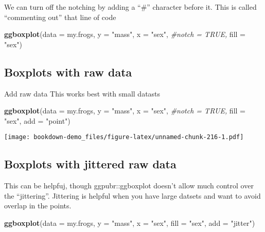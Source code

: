 \documentclass[]{book}
\newenvironment{Shaded}{\begin{snugshade}}{\end{snugshade}}
\newcommand{\KeywordTok}[1]{\textcolor[rgb]{0.13,0.29,0.53}{\textbf{#1}}}
\newcommand{\DataTypeTok}[1]{\textcolor[rgb]{0.13,0.29,0.53}{#1}}
\newcommand{\StringTok}[1]{\textcolor[rgb]{0.31,0.60,0.02}{#1}}
\newcommand{\CommentTok}[1]{\textcolor[rgb]{0.56,0.35,0.01}{\textit{#1}}}
\newcommand{\NormalTok}[1]{#1}
\theoremstyle{definition}
\theoremstyle{definition}
\theoremstyle{definition}
\theoremstyle{remark}
\begin{document}
We can turn off the notching by adding a ``\#'' character before it.
This is called ``commenting out'' that line of code

\begin{Shaded}
\begin{Highlighting}[]
\KeywordTok{ggboxplot}\NormalTok{(}\DataTypeTok{data =}\NormalTok{ my.frogs,}
          \DataTypeTok{y =} \StringTok{"mass"}\NormalTok{,}
          \DataTypeTok{x =} \StringTok{"sex"}\NormalTok{,}
          \CommentTok{#notch  = TRUE,}
          \DataTypeTok{fill =} \StringTok{"sex"}\NormalTok{)}
\end{Highlighting}
\end{Shaded}

\subsection{Boxplots with raw data}\label{boxplots-with-raw-data}

Add raw data This works best with small datasts

\begin{Shaded}
\begin{Highlighting}[]
\KeywordTok{ggboxplot}\NormalTok{(}\DataTypeTok{data =}\NormalTok{ my.frogs,}
          \DataTypeTok{y =} \StringTok{"mass"}\NormalTok{,}
          \DataTypeTok{x =} \StringTok{"sex"}\NormalTok{,}
          \CommentTok{#notch  = TRUE,}
          \DataTypeTok{fill =} \StringTok{"sex"}\NormalTok{,}
          \DataTypeTok{add =} \StringTok{"point"}\NormalTok{)}
\end{Highlighting}
\end{Shaded}

\texttt{[image: bookdown-demo\_files/figure-latex/unnamed-chunk-216-1.pdf]}

\subsection{Boxplots with jittered raw
data}\label{boxplots-with-jittered-raw-data}

This can be helpfuj, though ggpubr::ggboxplot doesn't allow much control
over the ``jittering''. Jittering is helpful when you have large datsets
and want to avoid overlap in the points.

\begin{Shaded}
\begin{Highlighting}[]
\KeywordTok{ggboxplot}\NormalTok{(}\DataTypeTok{data =}\NormalTok{ my.frogs,}
          \DataTypeTok{y =} \StringTok{"mass"}\NormalTok{,}
          \DataTypeTok{x =} \StringTok{"sex"}\NormalTok{,}
          \DataTypeTok{fill =} \StringTok{"sex"}\NormalTok{,}
          \DataTypeTok{add =} \StringTok{"jitter"}\NormalTok{)}
\end{Highlighting}
\end{Shaded}
\end{document}
